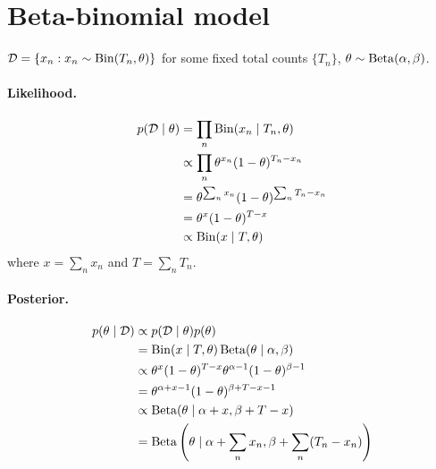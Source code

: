 \section{Beta-binomial model}
$\mathcal D = \{x_n : x_n \sim \operatorname{Bin}(T_n, \theta)\}$ for some fixed total counts $\{T_n\}$, $\theta \sim \operatorname{Beta}(\alpha, \beta)$.

\paragraph{Likelihood.}
    \begin{align*}
        p(\mathcal D \mid \theta)   &= \prod_n \operatorname{Bin}(x_n \mid T_n, \theta) \\
                                    &\propto \prod_n \theta^{x_n} (1 - \theta)^{T_n - x_n} \\
                                    &= \theta^{\sum_n x_n} (1 - \theta)^{\sum_n T_n - x_n} \\
                                    &= \theta^{x} (1 - \theta)^{T - x} \\
                                    &\propto \operatorname{Bin}(x \mid T, \theta)
    \end{align*}
where $x = \sum_n x_n$ and $T = \sum_n T_n$.

\paragraph{Posterior.}
    \begin{align*}
        p(\theta \mid \mathcal D)   &\propto p(\mathcal D \mid \theta) p(\theta) \\
                                    &= \operatorname{Bin}(x \mid T, \theta) \operatorname{Beta}(\theta \mid \alpha, \beta) \\
                                    &\propto \theta^{x} (1 - \theta)^{T - x} \theta^{\alpha - 1} (1 - \theta)^{\beta - 1} \\
                                    &= \theta^{\alpha + x - 1} (1 - \theta)^{\beta + T - x - 1} \\
                                    &\propto \operatorname{Beta}(\theta \mid \alpha + x, \beta + T - x) \\
                                    &= \operatorname{Beta}\left(\theta \mid \alpha + \sum_n x_n, \beta + \sum_n (T_n - x_n)\right)
    \end{align*}

